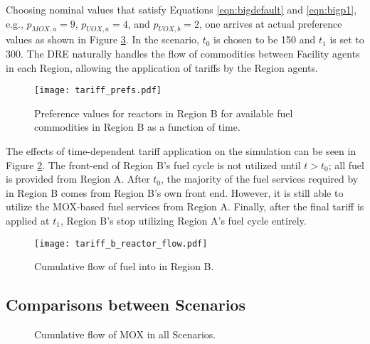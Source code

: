 Choosing nominal values that satisfy Equations \ref{eqn:bigdefault} and
\ref{eqn:bigp1}, e.g., $p_{MOX, a} = 9$, $p_{UOX, a} = 4$, and $p_{UOX, b} = 2$,
one arrives at actual preference values as shown in Figure \ref{fig:prefs}. In
the \tariff scenario, $t_0$ is chosen to be 150 and $t_1$ is set to
300. The DRE naturally handles the flow of commodities between Facility agents
in each Region, allowing the application of tariffs by the Region agents.

\begin{figure}
  \begin{center}
    \texttt{[image: tariff\_prefs.pdf]}
    \caption[]{
      \label{fig:prefs}
      Preference values for reactors in Region B for available fuel commodities
      in Region B as a function of time.}
  \end{center}
\end{figure}

The effects of time-dependent tariff application on the simulation can be seen
in Figure \ref{fig:tariff}. The front-end of Region B's fuel cycle is not
utilized until $t > t_0$; all fuel is provided from Region A. After $t_0$, the
majority of the fuel services required by \reactors in Region B comes from
Region B's own front end. However, it is still able to utilize the MOX-based
fuel services from Region A. Finally, after the final tariff is applied at
$t_1$, Region B's \reactors stop utilizing Region A's fuel cycle entirely.    

\begin{figure}
  \begin{center}
    \texttt{[image: tariff\_b\_reactor\_flow.pdf]}
    \caption[]{
      \label{fig:tariff}
      Cumulative flow of fuel into \reactors in Region B.}
  \end{center}
\end{figure}

\subsection{Comparisons between Scenarios}

\begin{figure}
  \centering
  \begin{minipage}{\textwidth}
    \centering
  \end{minipage}%
  \caption[]{
    \label{fig:prefs}
    Cumulative flow of MOX in all Scenarios.}
\end{figure}

